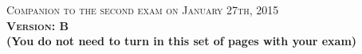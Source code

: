 \documentclass{docist}
\begin{document}
\thispagestyle{empty}

\begin{center}
  {\Large \textsc{Companion to the second exam on January 27th, 2015\\[2ex]
  \textbf{Version: B}\\[2ex]}}
  {\normalsize  \textbf{(You do not need to turn in this set of pages with your exam)}}
\end{center}



\qOrderPadTactics


\qTransactionScript

\qActiveRecordRuby

\qConcreteScenario

\qAvailabilityPingEchoHeartbeat

\qSecurityDatabase

\qSocialCalcTactic

\qThousandParsecScenario

\qGitTactic

\qModuleTraceability

\qArchitectureKnowledge

\qArchitectureEvolution

\qPerformitis

\qArchitecturalViews

\qArchitecturallySignificantRequirements

\qModueComponent

\qGeneralizationInterfaces

\qUsesIncremental


\qEtherCalcPerformance

\qEtherCalcTactic

\qEtherCalcTestability

\qComponentAndConnnector

\qEtherCalcViews

\qLoadBalancer

\qThreeTiers

\qPublishSubscribe

\qDeploymentPerformance

\qThousandParsecPersistence

\qSocialCalcBroadcastEvents

\qGitHubViews
\end{document}
